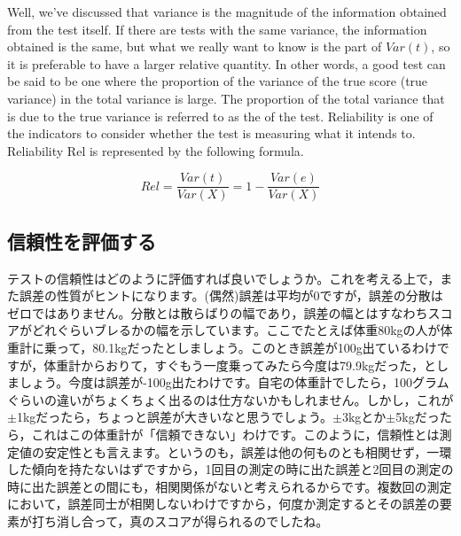 \documentclass{ltjbook}
\begin{document}
Well, we've discussed that variance is the magnitude of the information obtained from the test itself. If there are tests with the same variance, the information obtained is the same, but what we really want to know is the part of $Var(t)$, so it is preferable to have a larger relative quantity. In other words, a good test can be said to be one where the proportion of the variance of the true score (true variance) in the total variance is large.
The proportion of the total variance that is due to the true variance is referred to as the  of the test. Reliability is one of the indicators to consider whether the test is measuring what it intends to. Reliability Rel is represented by the following formula.

\[ Rel = \frac{Var(t)}{Var(X)} = 1 - \frac{Var(e)}{Var(X)} \]


\subsection{信頼性を評価する}
テストの信頼性はどのように評価すれば良いでしょうか。これを考える上で，また誤差の性質がヒントになります。(偶然)誤差は平均が$0$ですが，誤差の分散はゼロではありません。分散とは散らばりの幅であり，誤差の幅とはすなわちスコアがどれぐらいブレるかの幅を示しています。ここでたとえば体重80kgの人が体重計に乗って，80.1kgだったとしましょう。このとき誤差が100g出ているわけですが，体重計からおりて，すぐもう一度乗ってみたら今度は79.9kgだった，としましょう。今度は誤差が-100g出たわけです。自宅の体重計でしたら，100グラムぐらいの違いがちょくちょく出るのは仕方ないかもしれません。しかし，これが$\pm$1kgだったら，ちょっと誤差が大きいなと思うでしょう。$\pm$3kgとか$\pm$5kgだったら，これはこの体重計が「信頼できない」わけです。このように，信頼性とは測定値の安定性とも言えます。というのも，誤差は他の何ものとも相関せず，一環した傾向を持たないはずですから，1回目の測定の時に出た誤差と2回目の測定の時に出た誤差との間にも，相関関係がないと考えられるからです。複数回の測定において，誤差同士が相関しないわけですから，何度か測定するとその誤差の要素が打ち消し合って，真のスコアが得られるのでしたね。
\end{document}
